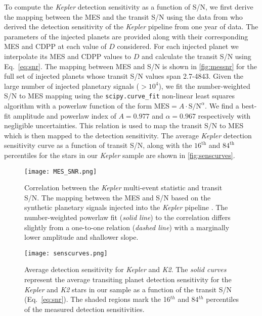 \documentclass[twocolumn]{emulateapj}
\newcommand{\kepler}[1]{\emph{Kepler}#1}
\newcommand{\ktwo}[1]{\emph{K2}#1}
\begin{document}
To compute the \kepler{} detection sensitivity as a function of S/N, we first
derive the mapping between the MES and the transit S/N using the data from \cite{christiansen15} who
derived the detection sensitivity of the \kepler{} pipeline from one year of data. 
The parameters of the injected planets are provided along with their corresponding MES and CDPP at each value of
$D$ considered. For each injected planet we interpolate its MES and CDPP values to $D$ and calculate
the transit S/N using Eq.~\ref{eq:snr}. The mapping between MES and S/N is shown in \autoref{fig:messnr}
for the full set of injected planets whose transit S/N values span 2.7-4843. Given the large number of injected planetary
signals ($>10^4$), we fit the number-weighted S/N to MES mapping using the \texttt{scipy.curve\_fit} non-linear least
squares algorithm with a powerlaw function of the form $\text{MES} = A\cdot \text{S/N}^{\alpha}$. We find a best-fit
amplitude and powerlaw index of $A=0.977$ and $\alpha=0.967$ respectively with negligible uncertainties.
This relation is used to map the transit S/N to MES
which is then mapped to the detection sensitivity. The average \kepler{} detection sensitivity curve as a function of
transit S/N, along with the $16^{\text{th}}$ and $84^{\text{th}}$ percentiles for the stars in our \kepler{} sample
are shown in \autoref{fig:senscurves}.


\begin{figure}
  \centering
  \texttt{[image: MES\_SNR.png]}
  \caption{Correlation between the \kepler{} multi-event statistic and transit S/N. The mapping between the MES and
    S/N based on the synthetic planetary signals injected into the \kepler{} pipeline \citep{christiansen15}.
    The number-weighted powerlaw fit (\emph{solid line}) to the correlation differs slightly from a one-to-one relation
    (\emph{dashed line}) with a marginally lower amplitude and shallower slope.}  
  \label{fig:messnr}
\end{figure}


\begin{figure}
  \centering
  \texttt{[image: senscurves.png]}
  \caption{Average detection sensitivity for \kepler{} and \ktwo{.} The \emph{solid curves} represent the
    average transiting planet detection sensitivity for the \kepler{} and \ktwo{} stars in our sample as
    a function of the transit S/N (Eq.~\ref{eq:snr}). The shaded regions mark the 16$^{th}$ and 84$^{th}$
    percentiles of the measured detection sensitivities.} 
  \label{fig:senscurves}
\end{figure}
\end{document}
